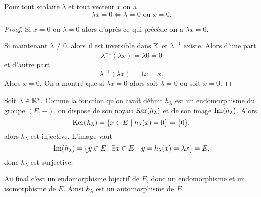 \begin{prop}
  Pour tout scalaire \(\lambda\) et tout vecteur \(x\) on a
  \begin{equation}
    \lambda x = 0 \iff \lambda = 0 \text{~ou~} x=0.
  \end{equation}
\end{prop}
\begin{proof}
  Si \(x=0\) ou \(\lambda=0\) alors d'après ce qui précède on a \(\lambda x=0\).

  Si maintenant \(\lambda \neq 0\), alors il est inversible dans \(\mathbb{K}\) et
  \(\lambda^{-1}\) existe. Alors d'une part
  \begin{equation}
    \lambda^{-1}(\lambda x)=\lambda 0 =0
  \end{equation}
  et d'autre part
  \begin{equation}
    \lambda^{-1}(\lambda x)=1 x=x.
  \end{equation}
  Alors \(x=0\). On a montré que si \(\lambda x=0\) alors soit \(\lambda=0\) ou
  soit \(x=0\).
\end{proof}

Soit \(\lambda \in \mathbb{K}^*\). Comme la fonction qu'on avait définit \(h_\lambda\)
est un endomorphisme du groupe \((E,+)\), on dispose de son noyau
\(\operatorname{Ker}(h_\lambda)\) et de son image \(\operatorname{Im}(h_\lambda)\). Alors
\begin{equation}
  \operatorname{Ker}(h_\lambda)=\left\{x \in E\mathrel{}\middle|\mathrel{}h_\lambda(x)=0\right\}=\{0\},
\end{equation}
alors \(h_\lambda\) est injective. L'image vaut
\begin{equation}
  \operatorname{Im}(h_\lambda)=\left\{y \in E\mathrel{}\middle|\mathrel{}\exists x \in E \quad y=h_\lambda(x)=\lambda
  x\right\} = E,
\end{equation}
donc \(h_\lambda\) est surjective.

Au final c'est un endomorphisme bijectif de \(E\), donc un endomorphisme et un
isomorphisme de \(E\). Ainsi \(h_\lambda\) est un automorphisme de \(E\).


